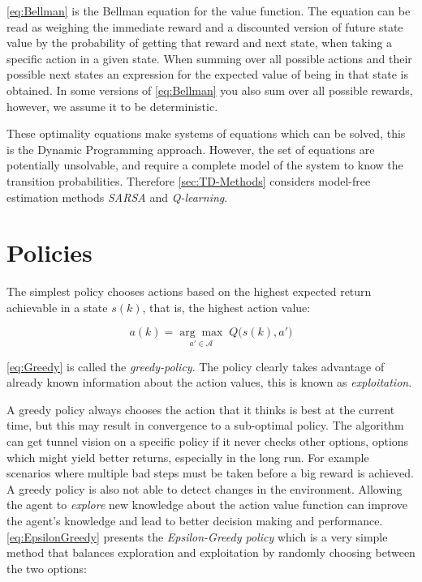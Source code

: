 \hfill 

\cref{eq:Bellman} is the Bellman equation for the value function. The equation can be read as weighing the immediate reward and a discounted version of future state value by the probability of getting that reward and next state, when taking a specific action in a given state.  When summing over all possible actions and their possible next states an expression for the expected value of being in that state is obtained. In some versions of \cref{eq:Bellman} you also sum over all possible rewards, however, we assume it to be deterministic.

These optimality equations make systems of equations which can be solved, this is the Dynamic Programming approach. However, the set of equations are potentially unsolvable, and require a complete model of the system to know the transition probabilities. Therefore \cref{sec:TD-Methods} considers model-free estimation methods \textit{SARSA} and \textit{Q-learning}.

\section{Policies}

The simplest policy chooses actions based on the highest expected return achievable in a state $ s(k) $, that is, the highest action value:

\begin{equation}\label{eq:Greedy}
	a(k)=\underset{a'\in \mathcal{A}}{\arg\max} \; Q\bigg(s(k),a'\bigg)
\end{equation}

\cref{eq:Greedy} is called the \textit{greedy-policy}. The policy clearly takes advantage of already known information about the action values, this is known as \textit{exploitation}.

A greedy policy always chooses the action that it thinks is best at the current time, but this may result in convergence to a sub-optimal policy. The algorithm can get tunnel vision on a specific policy if it never checks other options, options which might yield better returns, especially in the long run. For example scenarios where multiple bad steps must be taken before a big reward is achieved. A greedy policy is also not able to detect changes in the environment. Allowing the agent to \textit{explore} new knowledge about the action value function can improve the agent's knowledge and lead to better decision making and performance. \cref{eq:EpsilonGreedy} presents the \textit{Epsilon-Greedy policy} which is a very simple method that balances exploration and exploitation by randomly choosing between the two options:

